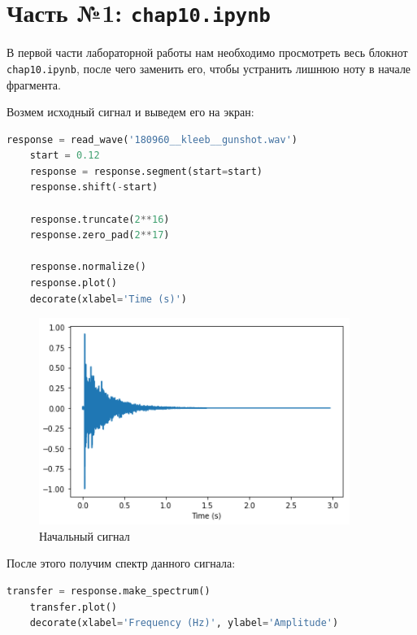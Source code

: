 \documentclass[a4paper]{article}
\begin{document}
    \newpage
        \section{Часть №1: \texttt{chap10.ipynb}}
            В первой части лабораторной работы нам необходимо просмотреть весь блокнот \texttt{chap10.ipynb}, после чего заменить его, чтобы устранить лишнюю ноту в начале фрагмента.
            
            Возмем исходный сигнал и выведем его на экран:
            
\begin{lstlisting}[language=Python, caption= Получение сигнала]
    response = read_wave('180960__kleeb__gunshot.wav')
    start = 0.12
    response = response.segment(start=start)
    response.shift(-start)
    
    response.truncate(2**16)
    response.zero_pad(2**17)
    
    response.normalize()
    response.plot()
    decorate(xlabel='Time (s)')
\end{lstlisting}
            
            \begin{figure}[H]
                \centering
                \includegraphics{ex_1_1.png}
                \caption{Начальный сигнал}
                \label{fig:ex_1_1}
            \end{figure}
            
            После этого получим спектр данного сигнала:
            
\begin{lstlisting}[language=Python, caption= Получение спектра первого сигнала]
    transfer = response.make_spectrum()
    transfer.plot()
    decorate(xlabel='Frequency (Hz)', ylabel='Amplitude')
\end{lstlisting}
            
\end{document}
